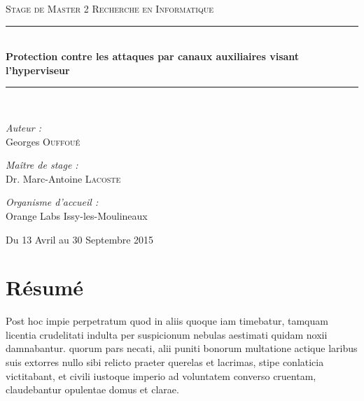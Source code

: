 \documentclass[oneside]{memoir}
\newcommand{\HRule}{\rule{\linewidth}{0.5mm}}
\begin{document}
\begin{titlingpage}
\begin{center}
\vspace{2cm}  
\textsc{\Large Stage de Master 2 Recherche en Informatique}\\[0.5cm]
 
 
\HRule \\[0.4cm]
{ \huge \bfseries Protection contre les attaques par canaux auxiliaires visant l'hyperviseur}\\[0.4cm]
 
\HRule \\[1.5cm]
 
\begin{minipage}{0.4\textwidth}
\begin{flushleft} \large
\emph{Auteur :}\\
Georges  \textsc{Ouffoué}
\end{flushleft}
\end{minipage}
\begin{minipage}{0.4\textwidth}
\begin{flushright} \large
\emph{Maître de stage :} \\
Dr. Marc-Antoine \textsc{Lacoste} 
\end{flushright}
\end{minipage}
\vfill
\emph{Organisme d'accueil : }\\
Orange Labs Issy-les-Moulineaux

 
\vfill


 
\large{ Du 13 Avril au  30 Septembre 2015}
 
\end{center}
 
\end{titlingpage}



\tableofcontents

\newpage
\thispagestyle{empty}%
\newpage

\chapter*{Résumé}

Post hoc impie perpetratum quod in aliis quoque iam timebatur, tamquam
licentia crudelitati indulta per suspicionum nebulas aestimati quidam
noxii damnabantur. quorum pars necati, alii puniti bonorum multatione
actique laribus suis extorres nullo sibi relicto praeter querelas et
lacrimas, stipe conlaticia victitabant, et civili iustoque imperio ad
voluntatem converso cruentam, claudebantur opulentae domus et
clarae.    
\end{document}
